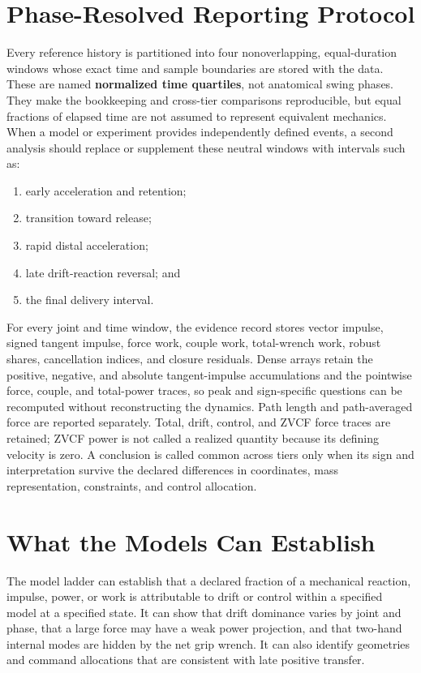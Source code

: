 \documentclass[
  letterpaper,
]{report}
\providecommand{\tightlist}{%
  \setlength{\itemsep}{0pt}\setlength{\parskip}{0pt}}
\begin{document}
\section{Phase-Resolved Reporting
Protocol}\label{sec-attribution-phases}

Every reference history is partitioned into four nonoverlapping,
equal-duration windows whose exact time and sample boundaries are stored
with the data. These are named \textbf{normalized time quartiles}, not
anatomical swing phases. They make the bookkeeping and cross-tier
comparisons reproducible, but equal fractions of elapsed time are not
assumed to represent equivalent mechanics. When a model or experiment
provides independently defined events, a second analysis should replace
or supplement these neutral windows with intervals such as:

\begin{enumerate}
\def\labelenumi{\arabic{enumi}.}
\tightlist
\item
  early acceleration and retention;
\item
  transition toward release;
\item
  rapid distal acceleration;
\item
  late drift-reaction reversal; and
\item
  the final delivery interval.
\end{enumerate}

For every joint and time window, the evidence record stores vector
impulse, signed tangent impulse, force work, couple work, total-wrench
work, robust shares, cancellation indices, and closure residuals. Dense
arrays retain the positive, negative, and absolute tangent-impulse
accumulations and the pointwise force, couple, and total-power traces,
so peak and sign-specific questions can be recomputed without
reconstructing the dynamics. Path length and path-averaged force are
reported separately. Total, drift, control, and ZVCF force traces are
retained; ZVCF power is not called a realized quantity because its
defining velocity is zero. A conclusion is called common across tiers
only when its sign and interpretation survive the declared differences
in coordinates, mass representation, constraints, and control
allocation.

\section{What the Models Can Establish}\label{sec-attribution-claims}

The model ladder can establish that a declared fraction of a mechanical
reaction, impulse, power, or work is attributable to drift or control
within a specified model at a specified state. It can show that drift
dominance varies by joint and phase, that a large force may have a weak
power projection, and that two-hand internal modes are hidden by the net
grip wrench. It can also identify geometries and command allocations
that are consistent with late positive transfer.
\end{document}
